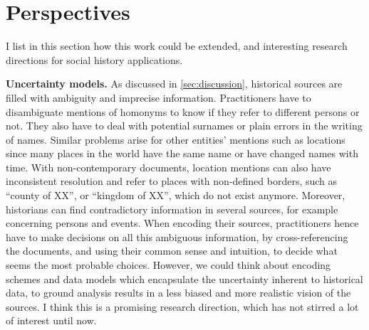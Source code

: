 \section{Perspectives}\label{sec:perspectives}

I list in this section how this work could be extended, and interesting research directions for social history \va applications.


\noindent\textbf{Uncertainty models.} As discussed in \autoref{sec:discussion}, historical sources are filled with ambiguity and imprecise information.
Practitioners have to disambiguate mentions of homonyms to know if they refer to different persons or not. They also have to deal with potential surnames or plain errors in the writing of names.
Similar problems arise for other entities' mentions such as locations since many places in the world have the same name or have changed names with time.
With non-contemporary documents, location mentions can also have inconsistent resolution and refer to places with non-defined borders, such as ``county of XX'', or ``kingdom of XX'', which do not exist anymore.
Moreover, historians can find contradictory information in several sources, for example concerning persons and events.
When encoding their sources, practitioners hence have to make decisions on all this ambiguous information, by cross-referencing the documents, and using their common sense and intuition, to decide what seems the most probable choices.
However, we could think about encoding schemes and data models which encapsulate the uncertainty inherent to historical data, to ground analysis results in a less biased and more realistic vision of the sources.
I think this is a promising research direction, which has not stirred a lot of interest until now.


